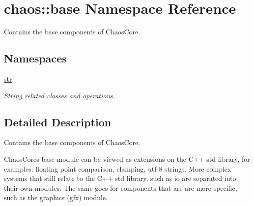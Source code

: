 \hypertarget{namespacechaos_1_1base}{}\section{chaos\+:\+:base Namespace Reference}
\label{namespacechaos_1_1base}


Contains the base components of Chaos\+Core.  


\subsection*{Namespaces}
\begin{DoxyCompactItemize}
\item 
 \hyperlink{namespacechaos_1_1base_1_1str}{str}
\begin{DoxyCompactList}\small\item\em String related classes and operations. \end{DoxyCompactList}\end{DoxyCompactItemize}


\subsection{Detailed Description}
Contains the base components of Chaos\+Core. 

Chaos\+Core\textquotesingle{}s base module can be viewed as extensions on the C++ std library, for examples\+: floating point comparison, clamping, utf-\/8 strings. More complex systems that still relate to the C++ std library, such as io are separated into their own modules. The same goes for components that are are more specific, such as the graphics (gfx) module. 